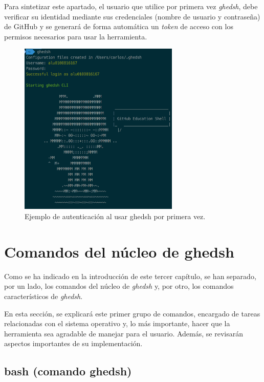 Para sintetizar este apartado, el usuario que utilice por primera vez {\it ghedsh}, debe verificar su identidad mediante sus credenciales (nombre de usuario y contraseña) de GitHub y se
generará de forma automática un {\it token} de acceso con los permisos necesarios para usar la herramienta.

\begin{figure}[H]
	\begin{center}
	\includegraphics[width=0.68\textwidth]{images/login-example}
	\caption{Ejemplo de autenticación al usar ghedsh por primera vez.}
	\label{fig:masterv1}
	\end{center}
\end{figure}

\section{Comandos del núcleo de ghedsh}
\label{3:sec:2}

Como se ha indicado en la introducción de este tercer capítulo, se han separado, por un lado, los comandos del núcleo de {\it ghedsh} y, por otro, los comandos característicos de {\it ghedsh}.
\bigskip

En esta sección, se explicará este primer grupo de comandos, encargado de tareas relacionadas con el sistema operativo y, lo más importante, hacer que la herramienta sea agradable de manejar para el usuario. Además, se revisarán aspectos importantes de su implementación.

\subsection{bash (comando ghedsh)}
\label{3.2.1}

